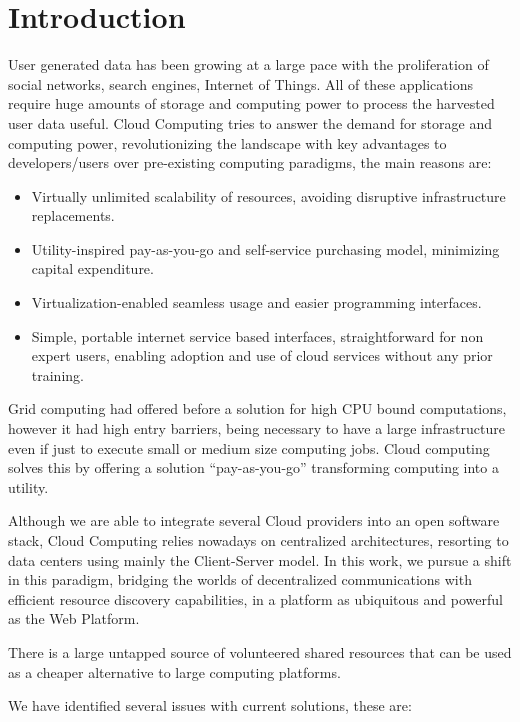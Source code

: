 
\section{Introduction}

User generated data has been growing at a large pace with the proliferation of social networks, search engines, Internet of Things. All of these applications require huge amounts of storage and computing power to process the harvested user data useful.
Cloud Computing tries to answer the demand for storage and computing power, revolutionizing the landscape with key advantages to developers/users over pre-existing computing paradigms, the main reasons are:

\begin{itemize}
    \item Virtually unlimited scalability of resources, avoiding disruptive infrastructure replacements.
    \item Utility-inspired pay-as-you-go and self-service purchasing model, minimizing capital expenditure.
    \item Virtualization-enabled seamless usage and easier programming interfaces.
    \item Simple, portable internet service based interfaces, straightforward for non expert users, enabling adoption and use of cloud services without any prior training.
\end{itemize}

Grid computing had offered before a solution for high CPU bound computations, however it had high entry barriers, being necessary to have a large infrastructure even if just to execute small or medium size computing jobs. Cloud computing solves this by offering a solution ``pay-as-you-go'' transforming computing into a utility.

Although we are able to integrate several Cloud providers into an open software stack, Cloud Computing relies nowadays on centralized architectures, resorting to data centers using mainly the Client-Server model. In this work, we pursue a shift in this paradigm, bridging the worlds of decentralized communications with efficient resource discovery capabilities, in a platform as ubiquitous and powerful as the Web Platform.

There is a large untapped source of volunteered shared resources that can be used as a cheaper alternative to large computing platforms.

We have identified several issues with current solutions, these are:

